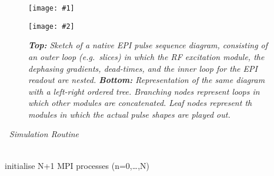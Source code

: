 \documentclass{nic-series}
\newcommand{\epsfiguresv}[6]{
 \begin{figure}[#5!]
   \begin{center}
    \texttt{[image: \#1]}
   \end{center}
   \begin{center}
    \texttt{[image: \#2]}
    \caption{{\sl #3}\label{#4}}
   \end{center}
 \end{figure}}
\begin{document}
\epsfiguresv{fig/EPI_sketch.eps}{fig//EPI_tree.eps}{{\bf Top:} Sketch of a native EPI pulse sequence diagram,
                consisting of an outer loop (e.g.~slices) in which
		the RF excitation module, the dephasing gradients, dead-times, and the inner loop for the EPI readout are nested.
		{\bf Bottom:} Representation of the same diagram with a left-right ordered tree. Branching nodes represent loops
		in which other modules are concatenated. Leaf nodes represent th modules in which the actual pulse shapes are
		played out.}{fig:epitree}{tp}{0.85}
\begin{algorithm}[t]
 \caption{$\;\;${\footnotesize\sl Simulation Routine}\label{parcode1}}
 \ \\ \scriptsize initialise N+1 MPI processes (n=0,\dots,N)\\ 
\end{algorithm}
\end{document}
